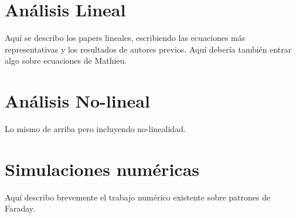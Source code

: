 	    
     \cite{miles1990parametrically}

\section{Análisis Lineal}

Aquí se describo los papers lineales, escribiendo las ecuaciones más representativas y los resultados de autores previos. Aquí debería también entrar algo sobre ecuaciones de Mathieu. 


\section{Análisis No-lineal}

      Lo mismo de arriba pero incluyendo no-linealidad.

\section{Simulaciones numéricas}

Aquí describo brevemente el trabajo numérico existente sobre patrones de Faraday.


\newpage



